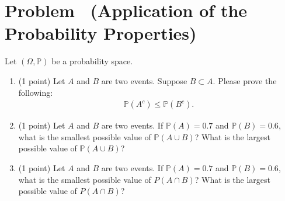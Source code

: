 \documentclass[11pt]{article}
\newcounter{pppp}
\newcommand{\prob}{\arabic{pppp}} %
\newcommand{\increase}{\addtocounter{pppp}{1}} %
\newcommand{\newproblem}[2]{
    \increase
    \section*{Problem \prob~(#1) \hfill {#2}}
}
\begin{document}
\newproblem{Application of the Probability Properties}{ }

Let $(\Omega, \mathbb{P})$ be a probability space.

\begin{enumerate}
\item (1 point) Let $A$ and $B$ are two events. Suppose $B\subset A$. Please prove the following:
\begin{align*}
\mathbb{P}(A^c) \le \mathbb{P}(B^c).
\end{align*}

\item (1 point) Let $A$ and $B$ are two events. If $\mathbb{P}(A) = 0.7$ and $\mathbb{P}(B)=0.6$,  what is the smallest possible value of $\mathbb{P}(A\cup B)$? What is the largest possible value of $\mathbb{P}(A\cup B)$? 

\item (1 point) Let $A$ and $B$ are two events. If $\mathbb{P}(A) = 0.7$ and $\mathbb{P}(B)=0.6$, what is the smallest possible value of $P(A\cap B)$? What is the largest possible value of $P(A\cap B)$? 


\end{enumerate}
\end{document}
